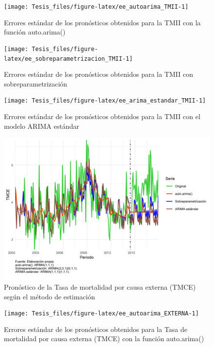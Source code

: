 \documentclass[
]{article}
\begin{document}
\begin{figure}[H]
\texttt{[image: Tesis\_files/figure-latex/ee\_autoarima\_TMII-1]} \caption{Errores estándar de los pronósticos obtenidos para la TMII con la función auto.arima()}\label{fig:ee_autoarima_TMII}
\end{figure}

\begin{figure}[H]
\texttt{[image: Tesis\_files/figure-latex/ee\_sobreparametrizacion\_TMII-1]} \caption{Errores estándar de los pronósticos obtenidos para la TMII con sobreparametrización}\label{fig:ee_sobreparametrizacion_TMII}
\end{figure}

\begin{figure}[H]
\texttt{[image: Tesis\_files/figure-latex/ee\_arima\_estandar\_TMII-1]} \caption{Errores estándar de los pronósticos obtenidos para la TMII con el modelo ARIMA estándar}\label{fig:ee_arima_estandar_TMII}
\end{figure}

\begin{figure}[H]
\includegraphics[width=1\linewidth,height=1\textheight]{Tesis_files/figure-latex/pronostico_EXTERNA-1} \caption{Pronóstico de la Tasa de mortalidad por causa externa (TMCE) según el método de estimación}\label{fig:pronostico_EXTERNA}
\end{figure}

\begin{figure}[H]
\texttt{[image: Tesis\_files/figure-latex/ee\_autoarima\_EXTERNA-1]} \caption{Errores estándar de los pronósticos obtenidos para la Tasa de mortalidad por causa externa (TMCE) con la función auto.arima()}\label{fig:ee_autoarima_EXTERNA}
\end{figure}
\end{document}
